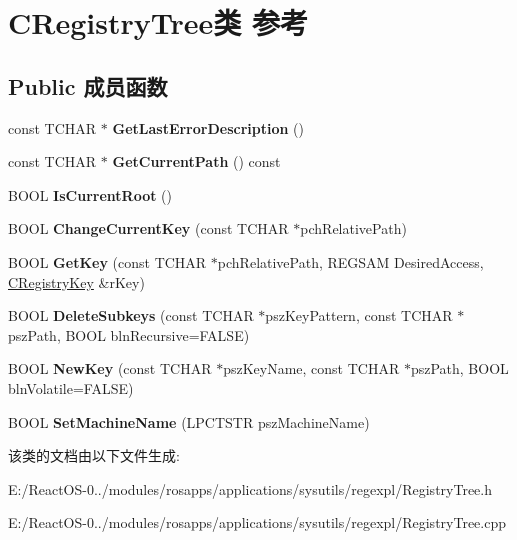 \hypertarget{class_c_registry_tree}{}\section{C\+Registry\+Tree类 参考}
\label{class_c_registry_tree}
\subsection*{Public 成员函数}
\begin{DoxyCompactItemize}
\item 
\mbox{\label{class_c_registry_tree_ac74dc2e6c359f0e31766eec30eb95867}} 
const T\+C\+H\+AR $\ast$ {\bfseries Get\+Last\+Error\+Description} ()
\item 
\mbox{\label{class_c_registry_tree_a84f908a6ebaf4ce0074e8b11c9a15796}} 
const T\+C\+H\+AR $\ast$ {\bfseries Get\+Current\+Path} () const
\item 
\mbox{\label{class_c_registry_tree_a8590da0895dad542e6c09d2a6c98ddc9}} 
B\+O\+OL {\bfseries Is\+Current\+Root} ()
\item 
\mbox{\label{class_c_registry_tree_ad41783bd3015c93c6ffdc963d5ad8b2e}} 
B\+O\+OL {\bfseries Change\+Current\+Key} (const T\+C\+H\+AR $\ast$pch\+Relative\+Path)
\item 
\mbox{\label{class_c_registry_tree_a5eea20dfd9aa8524eedeaf648aa3880f}} 
B\+O\+OL {\bfseries Get\+Key} (const T\+C\+H\+AR $\ast$pch\+Relative\+Path, R\+E\+G\+S\+AM Desired\+Access, \hyperlink{class_c_registry_key}{C\+Registry\+Key} \&r\+Key)
\item 
\mbox{\label{class_c_registry_tree_aef9f5a8a29f7d84b5c15a04c822980c5}} 
B\+O\+OL {\bfseries Delete\+Subkeys} (const T\+C\+H\+AR $\ast$psz\+Key\+Pattern, const T\+C\+H\+AR $\ast$psz\+Path, B\+O\+OL bln\+Recursive=F\+A\+L\+SE)
\item 
\mbox{\label{class_c_registry_tree_a2d0e2169f2c35d68e70ce344145f6b92}} 
B\+O\+OL {\bfseries New\+Key} (const T\+C\+H\+AR $\ast$psz\+Key\+Name, const T\+C\+H\+AR $\ast$psz\+Path, B\+O\+OL bln\+Volatile=F\+A\+L\+SE)
\item 
\mbox{\label{class_c_registry_tree_a6a7fc3ca6be58a6a8ef88317516bc1d6}} 
B\+O\+OL {\bfseries Set\+Machine\+Name} (L\+P\+C\+T\+S\+TR psz\+Machine\+Name)
\end{DoxyCompactItemize}


该类的文档由以下文件生成\+:\begin{DoxyCompactItemize}
\item 
E\+:/\+React\+O\+S-\/0../modules/rosapps/applications/sysutils/regexpl/Registry\+Tree.\+h\item 
E\+:/\+React\+O\+S-\/0../modules/rosapps/applications/sysutils/regexpl/Registry\+Tree.\+cpp\end{DoxyCompactItemize}
